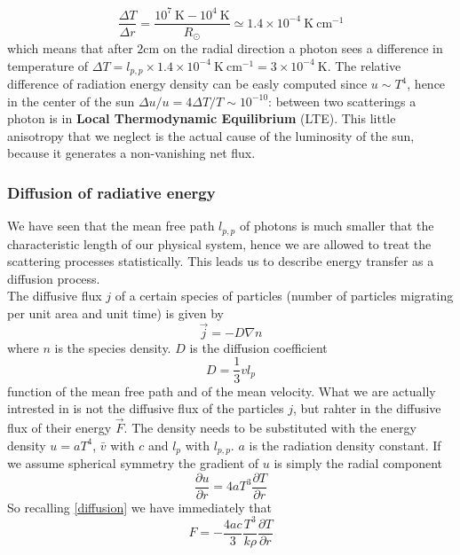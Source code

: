 \documentclass[11pt]{article}
\numberwithin{equation}{section}
\begin{document}
$$
\frac{\Delta T}{\Delta r} = \frac{10^7 \ \mathrm{K}-10^4  \ \mathrm{K}}{R_{\odot}} \simeq 1.4 \times 10^{-4} \  \mathrm{K} \ \mathrm{cm} ^{-1}
$$
which means that after $2 \mathrm{cm}$ on the radial direction a photon sees a difference in temperature of $\Delta T = l_{p,p} \times 1.4 \times 10^{-4}  \  \mathrm{K} \ \mathrm{cm} ^{-1}= 3 \times 10^{-4} \  \mathrm{K}$. The relative difference of radiation energy density can be easly computed since $u \sim T^4$, hence in the center of the sun $\Delta u/u=4 \Delta T / T \sim 10^{-10}$: between two scatterings a photon is in \textbf{Local Thermodynamic Equilibrium} (LTE). This little anisotropy that we neglect is the actual cause of the luminosity of the sun, because it generates a non-vanishing net flux.
\subsubsection{Diffusion of radiative energy}
We have seen that the mean free path $l_{p,p}$ of photons is much smaller that the characteristic length of our physical system, hence we are allowed to treat the scattering processes statistically. This leads us to describe energy transfer as a diffusion process. \\
The diffusive flux $j$ of a certain species of particles (number of particles migrating per unit area and unit time) is given by
\begin{equation}\label{diffusion}
	\vec  j=-D \nabla n
\end{equation}
where $n$ is the species density. $D$ is the diffusion coefficient
\begin{equation}
	D =\frac{1}{3} v l_{p}
\end{equation}
function of the mean free path and of the mean velocity. What we are actually intrested in is not the diffusive flux of the particles $j$, but rahter in the diffusive flux of their energy $\vec F$. The density needs to be substituted with the energy density $u=aT^4$, $\bar v$ with $c$ and $l_p$ with $l_{p,p}$. $a$ is the radiation density constant. If we assume spherical symmetry the gradient of $u$ is simply the radial component
\begin{equation}
	\frac{\partial u}{\partial r} = 4  a  T^3   \frac{\partial T}{\partial r}
\end{equation}
So recalling \ref{diffusion} we have immediately that
\begin{equation}
	F=-\frac{4ac}{3}\frac{T^3}{k \rho} \frac{\partial T}{\partial r}
\end{equation}
\end{document}
